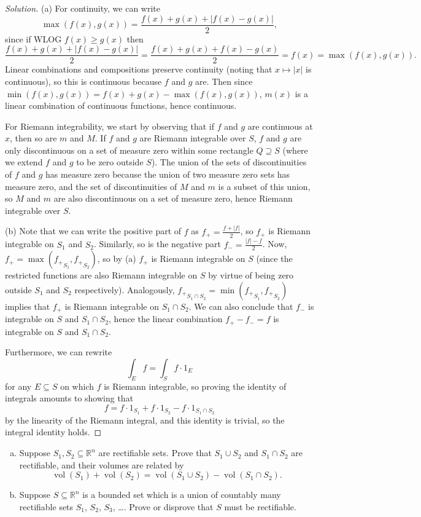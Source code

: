 \documentclass[10pt]{scrartcl}
\providecommand{\RR}{\mathbb R}
\providecommand{\ii}{\item}
\newenvironment{soln}{\begin{proof}[Solution]}{\end{proof}}
\begin{document}
\begin{soln}
	(a) For continuity, we can write
	\[\max(f(x),g(x)) = \frac{f(x) + g(x) + |f(x)-g(x)|}{2},\]
	since if WLOG $f(x)\ge g(x)$ then
	\[\frac{f(x)+g(x)+|f(x)-g(x)|}{2}
	= \frac{f(x)+g(x)+f(x)-g(x)}{2} = f(x) = \max(f(x),g(x)).\]
	Linear combinations and compositions preserve continuity
	(noting that $x\mapsto |x|$ is continuous),
	so this is continuous because $f$ and $g$ are.
	Then since $\min(f(x),g(x))=f(x)+g(x)-\max(f(x),g(x))$,
	$m(x)$ is a linear combination of continuous functions, hence continuous.
	
	For Riemann integrability, we start by observing that
	if $f$ and $g$ are continuous at $x$, then so are $m$ and $M$.
	If $f$ and $g$ are Riemann integrable over $S$,
	$f$ and $g$ are only discontinuous on a set of measure zero
	within some rectangle $Q\supseteq S$ (where we extend $f$ and $g$
	to be zero outside $S$).
	The union of the sets of discontinuities of $f$ and $g$
	has measure zero because the union of two measure zero sets
	has measure zero, and the set of discontinuities of $M$ and $m$
	is a subset of this union, so $M$ and $m$ are also
	discontinuous on a set of measure zero, hence Riemann integrable over $S$.
	
	(b) Note that we can write the positive part of $f$ as
	$f_+=\frac{f+|f|}{2}$, so $f_+$ is Riemann integrable on $S_1$ and $S_2$.
	Similarly, so is the negative part $f_-=\frac{|f|-f}{2}$.
	Now, $f_+ = \max({f_+}_{S_1},{f_+}_{S_2})$, so by (a)
	$f_+$ is Riemann integrable on $S$ (since the restricted functions
	are also Riemann integrable on $S$ by virtue of being zero
	outside $S_1$ and $S_2$ respectively).
	Analogously, ${f_+}_{S_1\cap S_2} = \min({f_+}_S_1,{f_+}_S_2)$
	implies that $f_+$ is Riemann integrable on $S_1\cap S_2$.
	We can also conclude that $f_-$ is integrable on $S$ and $S_1\cap S_2$,
	hence the linear combination $f_+-f_- = f$ is integrable
	on $S$ and $S_1\cap S_2$.
	
	Furthermore, we can rewrite
	\[\int_Ef = \int_S f\cdot 1_E\]
	for any $E\subseteq S$ on which $f$ is Riemann integrable, so
	proving the identity of integrals amounts to showing that
	\[f = f\cdot 1_{S_1} + f\cdot 1_{S_2} - f\cdot 1_{S_1\cap S_2}\]
	by the linearity of the Riemann integral,
	and this identity is trivial, so the integral identity holds.
\end{soln}

\begin{problem}
	\begin{enumerate}[(a)]
		\ii Suppose $S_1,S_2\subseteq\RR^n$ are rectifiable sets.
		Prove that $S_1\cup S_2$ and $S_1\cap S_2$ are rectifiable,
		and their volumes are related by
		\[\operatorname{vol}(S_1) + \operatorname{vol}(S_2)
		= \operatorname{vol}(S_1\cup S_2)-\operatorname{vol}(S_1\cap S_2).\]
		\ii Suppose $S\subseteq\RR^n$ is a bounded set
		which is a union of countably many rectifiable sets
		$S_1$, $S_2$, $S_3$, \dots. Prove or disprove that
		$S$ must be rectifiable.
	\end{enumerate}
\end{problem}
\end{document}
